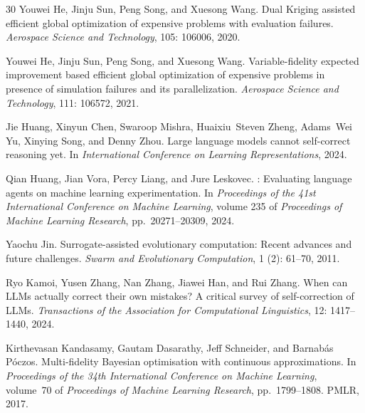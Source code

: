 \documentclass{article} %
\begin{document}
\begin{thebibliography}{30}
Youwei He, Jinju Sun, Peng Song, and Xuesong Wang.
\newblock Dual {Kriging} assisted efficient global optimization of expensive problems with evaluation failures.
\newblock \emph{Aerospace Science and Technology}, 105: 106006, 2020.

Youwei He, Jinju Sun, Peng Song, and Xuesong Wang.
\newblock Variable-fidelity expected improvement based efficient global optimization of expensive problems in presence of simulation failures and its parallelization.
\newblock \emph{Aerospace Science and Technology}, 111: 106572, 2021.

Jie Huang, Xinyun Chen, Swaroop Mishra, Huaixiu~Steven Zheng, Adams~Wei Yu, Xinying Song, and Denny Zhou.
\newblock Large language models cannot self-correct reasoning yet.
\newblock In \emph{International Conference on Learning Representations}, 2024.

Qian Huang, Jian Vora, Percy Liang, and Jure Leskovec.
: Evaluating language agents on machine learning experimentation.
\newblock In \emph{Proceedings of the 41st International Conference on Machine Learning}, volume 235 of \emph{Proceedings of Machine Learning Research}, pp.\  20271--20309, 2024.

Yaochu Jin.
\newblock Surrogate-assisted evolutionary computation: Recent advances and future challenges.
\newblock \emph{Swarm and Evolutionary Computation}, 1 (2): 61--70, 2011.

Ryo Kamoi, Yusen Zhang, Nan Zhang, Jiawei Han, and Rui Zhang.
\newblock When can {LLMs} actually correct their own mistakes? {A} critical survey of self-correction of {LLMs}.
\newblock \emph{Transactions of the Association for Computational Linguistics}, 12: 1417--1440, 2024.

Kirthevasan Kandasamy, Gautam Dasarathy, Jeff Schneider, and Barnab{\'a}s P{\'o}czos.
\newblock Multi-fidelity {Bayesian} optimisation with continuous approximations.
\newblock In \emph{Proceedings of the 34th International Conference on Machine Learning}, volume~70 of \emph{Proceedings of Machine Learning Research}, pp.\  1799--1808. PMLR, 2017.


\end{thebibliography}
\end{document}
